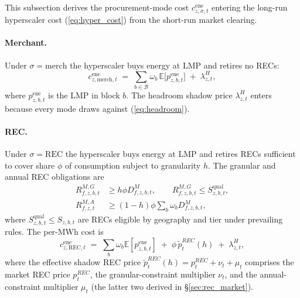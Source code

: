 \documentclass[12pt,letterpaper]{article}
\begin{document}
This subsection derives the procurement-mode cost
$c^{\mathrm{ene}}_{z,\sigma,t}$ entering the long-run hyperscaler cost
(\ref{eq:hyper_cost}) from the short-run market clearing.

\paragraph{Merchant.} Under $\sigma = \text{merch}$ the hyperscaler buys
energy at LMP and retires no RECs:
\begin{equation}
\label{eq:c_merch}
c^{\mathrm{ene}}_{z,\text{merch},t} \;=\; \sum_{b \in \mathcal{B}} \omega_b
\, \mathbb{E}\big[ p^{\text{ene}}_{z,b,t} \big] \;+\; \lambda^H_{z,t},
\end{equation}
where $p^{\text{ene}}_{z,b,t}$ is the LMP in block $b$. The headroom shadow
price $\lambda^H_{z,t}$ enters because every mode draws against
(\ref{eq:headroom}).

\paragraph{REC.} Under $\sigma = \text{REC}$ the hyperscaler buys energy at
LMP and retires RECs sufficient to cover share $\phi$ of consumption subject
to granularity $h$. The granular and annual REC obligations are
\begin{align}
\label{eq:gran_req}
R^{M,G}_{f,z,b,t} &\geq h \phi D^M_{f,z,b,t}, \qquad
R^{M,G}_{f,z,b,t} \leq S^{\text{qual}}_{z,b,t}, \\
\label{eq:annual_req}
R^{M,A}_{f,z,t} &\geq (1 - h) \phi \sum_b \omega_b D^M_{f,z,b,t},
\end{align}
where $S^{\text{qual}}_{z,b,t} \leq S_{z,b,t}$ are RECs eligible by
geography and tier under prevailing rules. The per-MWh cost is
\begin{equation}
\label{eq:c_rec}
c^{\mathrm{ene}}_{z,\text{REC},t} \;=\; \sum_b \omega_b \mathbb{E}[p^{\text{ene}}_{z,b,t}]
\;+\; \phi\, \tilde p^{REC}_t(h) \;+\; \lambda^H_{z,t},
\end{equation}
where the effective shadow REC price $\tilde p^{REC}_t(h) = p^{REC}_t + \nu_t
+ \mu_t$ comprises the market REC price $p^{REC}_t$, the granular-constraint
multiplier $\nu_t$, and the annual-constraint multiplier $\mu_t$ (the latter
two derived in \S\ref{sec:rec_market}).
\end{document}
